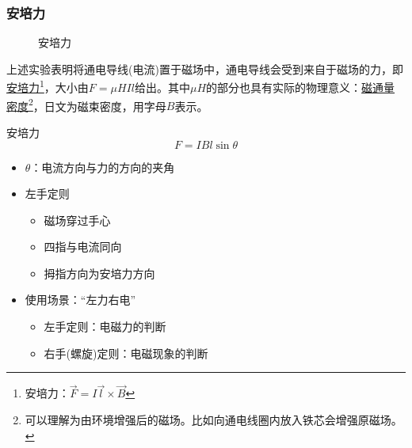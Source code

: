 \subsubsection{安培力}

\begin{figure}[ht!]
    \centering
    \caption{安培力}
\end{figure}
上述实验表明将通电导线(电流)置于磁场中，通电导线会受到来自于磁场的力，即\underline{安培力}\footnote{安培力：$\vec{F}=I\vec{l}\times\vec{B}$}，大小由$F=\mu HIl$给出。其中$\mu H$的部分也具有实际的物理意义：\underline{磁通量密度}\footnote{可以理解为由环境增强后的磁场。比如向通电线圈内放入铁芯会增强原磁场。}，日文为磁束密度，用字母$B$表示。
\begin{itembox}[l]{安培力}
    \begin{equation*}
        F=IBl\sin\theta
    \end{equation*}
    \begin{itemize}
        \item $\theta$：电流方向与力的方向的夹角
        \item 左手定则
        \begin{itemize}
            \item 磁场穿过手心
            \item 四指与电流同向
            \item 拇指方向为安培力方向
        \end{itemize}
        \item 使用场景：“左力右电”
        \begin{itemize}
            \item 左手定则：电磁力的判断
            \item 右手(螺旋)定则：电磁现象的判断
        \end{itemize}
    \end{itemize}
\end{itembox}

